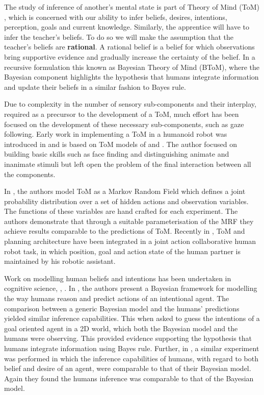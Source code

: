 The study of inference of another's mental state is part of Theory of Mind (ToM) \cite{Towards_a_ToM_2010}, which is concerned 
with our ability to infer beliefs, desires, intentions, perception,
goals and current knowledge. Similarly, the apprentice will have to infer the teacher's beliefs. To do so we will  make the 
assumption that the teacher's beliefs are \textbf{rational}. 
A rational belief is a belief for which observations bring supportive evidence and 
gradually increase the certainty of the belief. In a recursive formulation this known as Bayesian Theory of Mind (BToM),
where the Bayesian component highlights the hypothesis that humans integrate information and update their beliefs in a similar 
fashion to Bayes rule.

Due to complexity in the number of sensory sub-components and their interplay, required as a precursor to the development
of a ToM, much effort has been focused on the development of these necessary sub-components, such as gaze following.
Early work in implementing a ToM in a humanoid robot was introduced in \cite{ToM_humanoid} and is based on ToM models of \cite{Leslie_TOMM} 
and \cite{Baron-Cohen}. The author focused on building basic skills such as face finding and distinguishing animate and inanimate 
stimuli but left open the problem of the final interaction between all the components.

In \cite{MRF_ToM}, the authors model ToM as a Markov Random Field which defines a joint probability distribution over a set of
hidden actions and observation variables. The functions of these variables are hand crafted for each experiment. 
The authors demonstrate that through a suitable parameterisation of the MRF they achieve results comparable to the predictions of ToM.
Recently in \cite{ToM_HRI_2106}, ToM and planning architecture have been integrated in a joint action collaborative human robot task, 
in which position, goal and action state of the human partner is maintained by his robotic assistant.

Work on modelling human beliefs and intentions has been undertaken in cognitive science, \cite{Bake_Saxe_Tene_2011}, 
\cite{Richardson1_Baker1_Tenenbaum1_Saxe1_2012}. In \cite{Bake_Tene_Saxe_2006}, the authors present a Bayesian framework 
for modelling the way humans reason and predict actions of an intentional agent. The comparison between 
a generic Bayesian model and the humans' predictions yielded similar inference capabilities.
This when asked to guess the intentions of a goal oriented agent in a 2D world, which both the Bayesian model and the 
humans were observing. This provided evidence supporting the hypothesis that humans integrate information using Bayes rule. 
Further, in \cite{Bake_Saxe_Tene_2011}, a similar experiment was performed in which the inference capabilities of humans,
with regard to both belief and desire of an agent, were comparable to that of their Bayesian model. Again they found
the humans inference was comparable to that of the Bayesian model.

